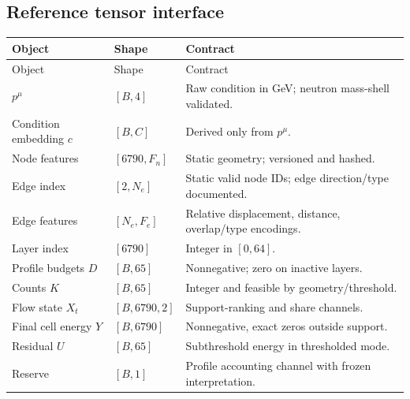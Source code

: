 \documentclass[11pt]{article}
\theoremstyle{definition}
\theoremstyle{remark}
\begin{document}
\subsection{Reference tensor interface}
\begin{longtable}{p{}p{}p{}}
\toprule
Object & Shape & Contract \\
\midrule
\endfirsthead
\toprule
Object & Shape & Contract \\
\midrule
\endhead
$p^\mu$ & $[B,4]$ & Raw condition in GeV; neutron mass-shell validated. \\
Condition embedding $c$ & $[B,C]$ & Derived only from $p^\mu$. \\
Node features & $[6790,F_n]$ & Static geometry; versioned and hashed. \\
Edge index & $[2,N_e]$ & Static valid node IDs; edge direction/type documented. \\
Edge features & $[N_e,F_e]$ & Relative displacement, distance, overlap/type encodings. \\
Layer index & $[6790]$ & Integer in $[0,64]$. \\
Profile budgets $D$ & $[B,65]$ & Nonnegative; zero on inactive layers. \\
Counts $K$ & $[B,65]$ & Integer and feasible by geometry/threshold. \\
Flow state $X_t$ & $[B,6790,2]$ & Support-ranking and share channels. \\
Final cell energy $Y$ & $[B,6790]$ & Nonnegative, exact zeros outside support. \\
Residual $U$ & $[B,65]$ & Subthreshold energy in thresholded mode. \\
Reserve & $[B,1]$ & Profile accounting channel with frozen interpretation. \\
\bottomrule
\end{longtable}
\end{document}
